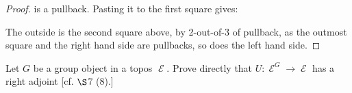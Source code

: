 \documentclass[a4paper]{article}
\DeclareMathOperator{\E}{\mathcal E}
\DeclareMathOperator{\abf}{\mathbf a}
\begin{document}
\begin{proof}
    is a pullback. Pasting it to the first square gives:

    \begin{center}
    \end{center}

    The outside is the second square above, by 2-out-of-3 of pullback, as the outmost square and the right hand side are pullbacks, so does the left hand side. 
\end{proof}

\begin{question}
    Let $G$ be a group object in a topos $\E$. Prove directly that $U:\E^G\to\E$ has a right adjoint [cf. $\S$7 (8).]
\end{question}
\end{document}
